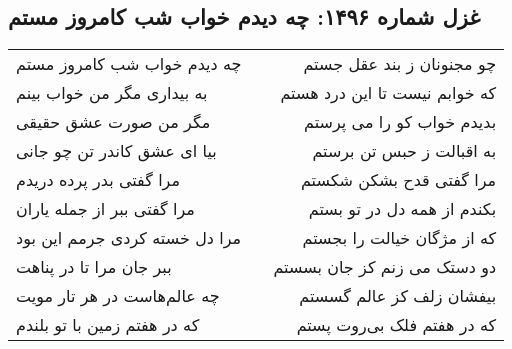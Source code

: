 \begin{center}
\section*{غزل شماره ۱۴۹۶: چه دیدم خواب شب کامروز مستم}
\label{sec:1496}
\begin{longtable}{l p{0.5cm} r}
چه دیدم خواب شب کامروز مستم
&&
چو مجنونان ز بند عقل جستم
\\
به بیداری مگر من خواب بینم
&&
که خوابم نیست تا این درد هستم
\\
مگر من صورت عشق حقیقی
&&
بدیدم خواب کو را می پرستم
\\
بیا ای عشق کاندر تن چو جانی
&&
به اقبالت ز حبس تن برستم
\\
مرا گفتی بدر پرده دریدم
&&
مرا گفتی قدح بشکن شکستم
\\
مرا گفتی ببر از جمله یاران
&&
بکندم از همه دل در تو بستم
\\
مرا دل خسته کردی جرمم این بود
&&
که از مژگان خیالت را بجستم
\\
ببر جان مرا تا در پناهت
&&
دو دستک می زنم کز جان بسستم
\\
چه عالم‌هاست در هر تار مویت
&&
بیفشان زلف کز عالم گسستم
\\
که در هفتم زمین با تو بلندم
&&
که در هفتم فلک بی‌روت پستم
\\
\end{longtable}
\end{center}
